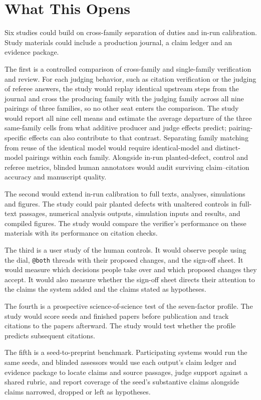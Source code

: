 \documentclass[
]{article}
\begin{document}
\section{What This Opens}\label{what-this-opens}

Six studies could build on cross-family separation of duties and in-run
calibration. Study materials could include a production journal, a claim
ledger and an evidence package.

The first is a controlled comparison of cross-family and single-family
verification and review. For each judging behavior, such as citation
verification or the judging of referee answers, the study would replay
identical upstream steps from the journal and cross the producing family
with the judging family across all nine pairings of three families, so
no other seat enters the comparison. The study would report all nine
cell means and estimate the average departure of the three same-family
cells from what additive producer and judge effects predict;
pairing-specific effects can also contribute to that contrast.
Separating family matching from reuse of the identical model would
require identical-model and distinct-model pairings within each family.
Alongside in-run planted-defect, control and referee metrics, blinded
human annotators would audit surviving claim--citation accuracy and
manuscript quality.

The second would extend in-run calibration to full texts, analyses,
simulations and figures. The study could pair planted defects with
unaltered controls in full-text passages, numerical analysis outputs,
simulation inputs and results, and compiled figures. The study would
compare the verifier's performance on these materials with its
performance on citation checks.

The third is a user study of the human controls. It would observe people
using the dial, \texttt{@both} threads with their proposed changes, and
the sign-off sheet. It would measure which decisions people take over
and which proposed changes they accept. It would also measure whether
the sign-off sheet directs their attention to the claims the system
added and the claims stated as hypotheses.

The fourth is a prospective science-of-science test of the seven-factor
profile. The study would score seeds and finished papers before
publication and track citations to the papers afterward. The study would
test whether the profile predicts subsequent citations.

The fifth is a seed-to-preprint benchmark. Participating systems would
run the same seeds, and blinded assessors would use each output's claim
ledger and evidence package to locate claims and source passages, judge
support against a shared rubric, and report coverage of the seed's
substantive claims alongside claims narrowed, dropped or left as
hypotheses.
\end{document}
